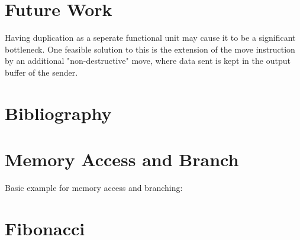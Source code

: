 \documentclass[adraft]{eptcs}
\begin{document}
	\section{Future Work}
		Having duplication as a seperate functional unit may cause it to be a significant bottleneck.
		One feasible solution to this is the extension of the move instruction by an additional "non-destructive" move, where data sent is kept in the output buffer of the sender.
		

	\newpage
	\section{Bibliography}
		
		
	\newpage
	
	\begin{appendices}
		\newpage
		\section{Memory Access and Branch}
			\label{app:simple}
			Basic example for memory access and branching:
			
		
		\newpage
		\section{Fibonacci}
			\label{app:fib}
			
	\end{appendices}
	
\end{document}
